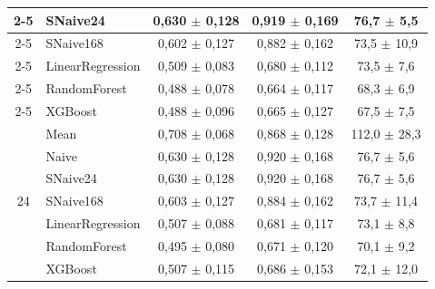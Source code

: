 \begin{table}[htbp]
\begin{tabular}{|c|l|c|c|c|}
\cline{2-5}
 & SNaive24 & 0{,}630 $\pm$ 0{,}128 & 0{,}919 $\pm$ 0{,}169 & 76{,}7 $\pm$ 5{,}5 \\
\cline{2-5}
 & SNaive168 & 0{,}602 $\pm$ 0{,}127 & 0{,}882 $\pm$ 0{,}162 & 73{,}5 $\pm$ 10{,}9 \\
\cline{2-5}
 & LinearRegression & 0{,}509 $\pm$ 0{,}083 & 0{,}680 $\pm$ 0{,}112 & 73{,}5 $\pm$ 7{,}6 \\
\cline{2-5}
 & RandomForest & 0{,}488 $\pm$ 0{,}078 & 0{,}664 $\pm$ 0{,}117 & 68{,}3 $\pm$ 6{,}9 \\
\cline{2-5}
 & XGBoost & 0{,}488 $\pm$ 0{,}096 & 0{,}665 $\pm$ 0{,}127 & 67{,}5 $\pm$ 7{,}5 \\
\hline
\multirow{7}{*}{24} & Mean & 0{,}708 $\pm$ 0{,}068 & 0{,}868 $\pm$ 0{,}128 & 112{,}0 $\pm$ 28{,}3 \\
\cline{2-5}
 & Naive & 0{,}630 $\pm$ 0{,}128 & 0{,}920 $\pm$ 0{,}168 & 76{,}7 $\pm$ 5{,}6 \\
\cline{2-5}
 & SNaive24 & 0{,}630 $\pm$ 0{,}128 & 0{,}920 $\pm$ 0{,}168 & 76{,}7 $\pm$ 5{,}6 \\
\cline{2-5}
 & SNaive168 & 0{,}603 $\pm$ 0{,}127 & 0{,}884 $\pm$ 0{,}162 & 73{,}7 $\pm$ 11{,}4 \\
\cline{2-5}
 & LinearRegression & 0{,}507 $\pm$ 0{,}088 & 0{,}681 $\pm$ 0{,}117 & 73{,}1 $\pm$ 8{,}8 \\
\cline{2-5}
 & RandomForest & 0{,}495 $\pm$ 0{,}080 & 0{,}671 $\pm$ 0{,}120 & 70{,}1 $\pm$ 9{,}2 \\
\cline{2-5}
 & XGBoost & 0{,}507 $\pm$ 0{,}115 & 0{,}686 $\pm$ 0{,}153 & 72{,}1 $\pm$ 12{,}0 \\
\hline
\end{tabular}
\end{table}
